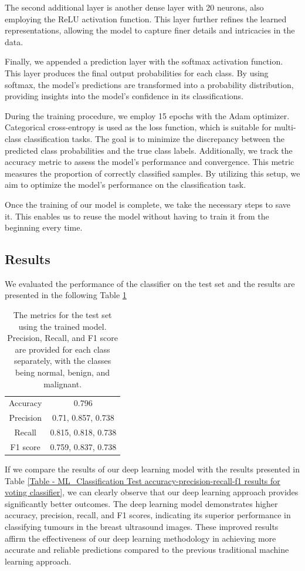 The second additional layer is another dense layer with 20 neurons, also employing the ReLU activation function. This layer further refines the learned representations, allowing the model to capture finer details and intricacies in the data.

Finally, we appended a prediction layer with the softmax activation function. This layer produces the final output probabilities for each class. By using softmax, the model's predictions are transformed into a probability distribution, providing insights into the model's confidence in its classifications.

During the training procedure, we employ 15 epochs with the Adam optimizer. Categorical cross-entropy is used as the loss function, which is suitable for multi-class classification tasks. The goal is to minimize the discrepancy between the predicted class probabilities and the true class labels. Additionally, we track the accuracy metric to assess the model's performance and convergence. This metric measures the proportion of correctly classified samples. By utilizing this setup, we aim to optimize the model's performance on the classification task.

Once the training of our model is complete, we take the necessary steps to save it. This enables us to reuse the model without having to train it from the beginning every time.

\subsection{Results}
We evaluated the performance of the classifier on the test set and the results are presented in the following Table \ref{Table - DL_Classification Test accuracy-precision-recall-f1 results for our model}
\begin{table}[H]
\centering
\begin{tabular}{cc}
Accuracy  & 0.796               \\
Precision & 0.71, 0.857, 0.738  \\
Recall    & 0.815, 0.818, 0.738 \\
F1 score  & 0.759, 0.837, 0.738
\end{tabular}
\caption{The metrics for the test set using the trained model. Precision, Recall, and F1 score are provided for each class separately, with the classes being normal, benign, and malignant.}
\label{Table - DL_Classification Test accuracy-precision-recall-f1 results for our model}
\end{table}
If we compare the results of our deep learning model with the results presented in Table \ref{Table - ML_Classification Test accuracy-precision-recall-f1 results for voting classifier}, we can clearly observe that our deep learning approach provides significantly better outcomes. The deep learning model demonstrates higher accuracy, precision, recall, and F1 scores, indicating its superior performance in classifying tumours in the breast ultrasound images. These improved results affirm the effectiveness of our deep learning methodology in achieving more accurate and reliable predictions compared to the previous traditional machine learning approach.

